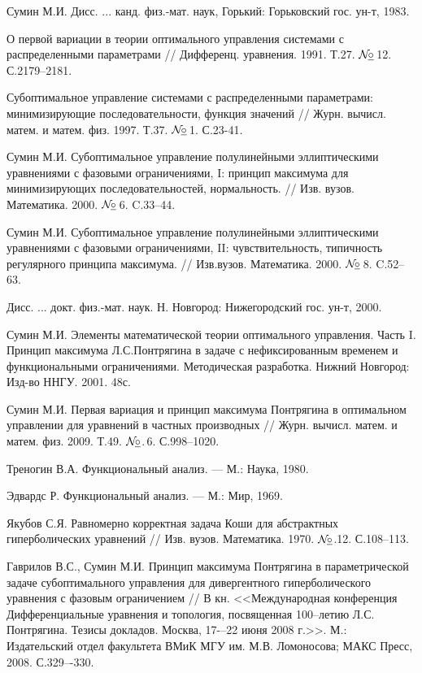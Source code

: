 \documentclass{report}
\newcommand{\No}{${\cal N}{\!}\underline{\circ}$}
\begin{document}
\begin{thebibliography}{99}
 {Сумин М.И.} Дисс. ... канд. физ.-мат. наук, Горький: Горьковский гос. ун-т, 1983.

 О первой вариации в теории оптимального управления системами с распределенными параметрами // Дифференц. уравнения. 1991.  Т.27. \No\,12.  С.2179--2181.

 Субоптимальное управление системами с распределенными параметрами: минимизирующие последовательности,
функция значений // Журн. вычисл. матем. и матем. физ. 1997. Т.37. \No\,1. С.23-41.

Сумин М.И. Субоптимальное управление полулинейными эллиптическими уравнениями с фазовыми ограничениями, I: принцип
максимума для минимизирующих последовательностей, нормальность. // Изв. вузов. Математика. 2000. \No\,6. C.33--44.

Сумин М.И. Субоптимальное управление полулинейными эллиптическими уравнениями с фазовыми ограничениями, II:
чувствительность, типичность регулярного принципа максимума. // Изв.вузов. Математика. 2000. \No\,8. C.52--63.

  Дисс. ... докт. физ.-мат. наук. Н. Новгород: Нижегородский гос. ун-т, 2000.

 Сумин М.И. Элементы математической теории оптимального управления. Часть I. Принцип максимума Л.С.Понтрягина
в задаче с нефиксированным временем и функциональными ограничениями. Методическая разработка. Нижний Новгород: Изд-во ННГУ. 2001. 48с.

 {Сумин М.И.} Первая вариация и принцип максимума Понтрягина в оптимальном управлении для уравнений в
частных производных // Журн. вычисл. матем. и матем. физ. 2009. Т.49. \No.\,6. С.998--1020.

Треногин В.А. Функциональный анализ. --- М.: Наука, 1980.

 Эдвардс Р. Функциональный анализ. --- М.: Мир, 1969.

 Якубов С.Я. Равномерно корректная задача Коши для абстрактных гиперболических уравнений // Изв. вузов. Математика. 1970. \No.12. С.108--113.


Гаврилов В.С., Сумин М.И. Принцип максимума Понтрягина в параметрической задаче субоптимального управления для дивергентного гиперболического уравнения с фазовым
ограничением // В кн. <<Международная конференция \glqq Дифференциальные уравнения и топология\grqq, посвященная 100--летию Л.С. Понтрягина. Тезисы докладов. Москва,
17-–22 июня 2008 г.>>. М.: Издательский отдел факультета ВМиК МГУ им. М.В. Ломоносова; МАКС Пресс, 2008. С.329–-330.


\end{thebibliography}
\end{document}
